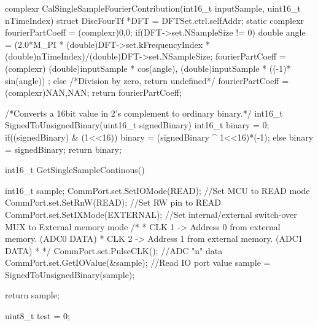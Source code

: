 complexr CalSingleSampleFourierContribution(int16_t inputSample, uint16_t nTimeIndex){
	struct DiscFourTf *DFT = DFTSet.ctrl.selfAddr;
	static complexr fourierPartCoeff = (complexr){0,0};
	if(DFT->set.NSampleSize != 0){ 
		double angle = (2.0*M_PI * (double)DFT->set.kFrequencyIndex * (double)nTimeIndex)/(double)DFT->set.NSampleSize;
		fourierPartCoeff = (complexr){
			(double)inputSample * cos(angle),
			(double)inputSample * ((-1)* sin(angle))
		};
	}else{ /*Division by zero, return undefined*/
		fourierPartCoeff = (complexr){NAN,NAN};
	}
	return fourierPartCoeff;
}

/*Converts a 16bit value in 2's complement to ordinary binary.*/
int16_t SignedToUnsignedBinary(uint16_t signedBinary){
	int16_t binary = 0;
	if((signedBinary) & (1<<16)) {
		binary = (signedBinary ^ 1<<16)*(-1);
	}
	else{
		binary = signedBinary;
	}
	return binary;
}

int16_t GetSingleSampleContinous(){
	int16_t sample;
	CommPort.set.SetIOMode(READ); //Set MCU to READ mode
	CommPort.set.SetRnW(READ);    //Set RW pin to READ
	CommPort.set.SetIXMode(EXTERNAL); //Set internal/external switch-over MUX to External memory mode
	/*
	* CLK 1 -> Address 0 from external memory. (ADC0 DATA)
	* CLK 2 -> Address 1 from external memory. (ADC1 DATA)
	* */
	CommPort.set.PulseCLK(); //ADC "n" data
	CommPort.set.GetIOValue(&sample); //Read IO port value
	sample = SignedToUnsignedBinary(sample);

	return sample;
}

uint8_t test = 0;

